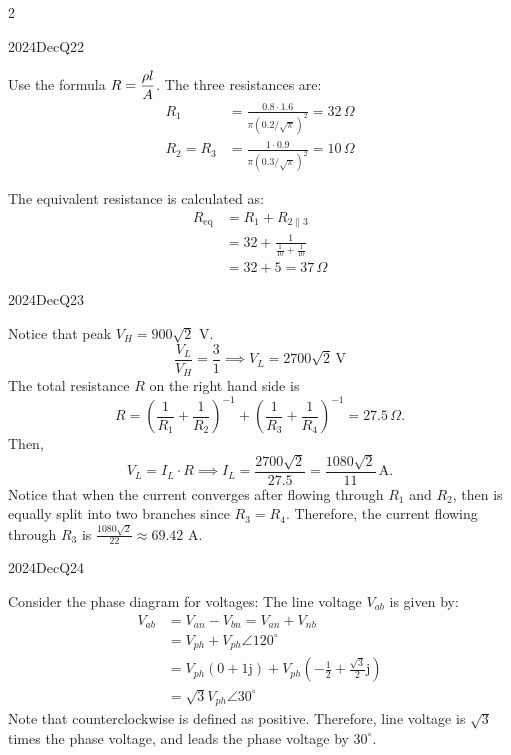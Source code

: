 \begin{multicols}{2}
\begin{qsolution}{2024}{Dec}{Q22}{\tgEE \tgEECircuitAnalysis}

    Use the formula $\displaystyle R=\frac{\rho l}{A}$.
    The three resistances are:
    \begin{align*}
        R_1 &= \frac{0.8\cdot 1.6}{\pi\left(0.2/\sqrt\pi\right)^2}=32\,\Omega\\
        R_2 =R_3 &= \frac{1\cdot 0.9}{\pi\left(0.3/\sqrt\pi\right)^2}=10\,\Omega
    \end{align*}

    The equivalent resistance is calculated as:
    \begin{align*}
        R_{\mathrm{eq}} &= R_1 + R_{2\parallel 3} \\
        &= 32 + \frac{1}{\frac{1}{10}+\frac{1}{10}} \\
        &= 32 + 5 = 37\,\Omega
    \end{align*}
\end{qsolution}

\begin{qsolution}{2024}{Dec}{Q23}{\tgEE \tgEECircuitAnalysis}
    
    Notice that peak $V_H=900\sqrt2$ V.
    \[
        \frac{V_L}{V_H}=\frac{3}{1} \implies V_L=2700\sqrt{2}\,\mathrm{V}
    \]
    The total resistance $R$ on the right hand side is
    \[
    R=\left(\frac{1}{R_1}+\frac{1}{R_2}\right)^{-1}+\left(\frac{1}{R_3}+\frac{1}{R_4}\right)^{-1}=27.5\,\Omega.
    \]
    Then,
    \[
        V_L=I_L\cdot R \implies I_L=\frac{2700\sqrt 2}{27.5}=\frac{1080\sqrt 2}{11}\,\mathrm{A}.
    \]
    Notice that when the current converges after flowing through $R_1$ and $R_2$, then is equally split into two branches since $R_3=R_4$.
    Therefore, the current flowing through $R_3$ is $\displaystyle\frac{1080\sqrt 2}{22}\approx 69.42$ A.
\end{qsolution}

\begin{qsolution}{2024}{Dec}{Q24}{\tgEE \tgEEThreePhase {}\label{q:2024-dec-mcq24}}
    
    Consider the phase diagram for voltages:
    The line voltage $V_{ab}$ is given by:
    \begin{align*}
        V_{ab}&=V_{an}-V_{bn}=V_{an}+V_{nb}\\
        &=V_{ph}+V_{ph}\angle 120^\circ \\
        &=V_{ph}\left(0+1\mathrm{j}\right) + V_{ph}\left(-\frac{1}{2}+\frac{\sqrt{3}}{2}\mathrm{j}\right) \\
        &=\sqrt{3}V_{ph}\angle 30^\circ
    \end{align*}
    Note that counterclockwise is defined as positive.
    Therefore, line voltage is $\sqrt{3}$ times the phase voltage, and leads the phase voltage by $30^\circ$.
\end{qsolution}


\end{multicols}
